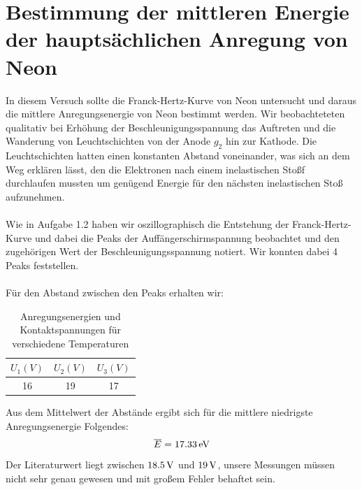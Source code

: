 \documentclass[a4paper,titlepage]{scrartcl}
\numberwithin{equation}{section}
\begin{document}
\section{Bestimmung der mittleren Energie der hauptsächlichen Anregung von Neon}
In diesem Versuch sollte die Franck-Hertz-Kurve von Neon untersucht und daraus die mittlere Anregungsenergie von Neon bestimmt werden. Wir beobachteteten qualitativ bei Erhöhung der Beschleunigungsspannung das Auftreten und die Wanderung von Leuchtschichten von der Anode $g_2$ hin zur Kathode. Die Leuchtschichten hatten einen konstanten Abstand voneinander, was sich an dem Weg erklären lässt, den die Elektronen nach einem inelastischen Stoßf durchlaufen mussten um genügend Energie für den nächsten inelastischen Stoß aufzunehmen.\\ \\
Wie in Aufgabe 1.2 haben wir oszillographisch die Entstehung der Franck-Hertz-Kurve und dabei die Peaks der Auffängerschirmspannung beobachtet und den zugehörigen Wert der Beschleunigungsspannung notiert. Wir konnten dabei 4 Peaks feststellen.\\ \\
Für den Abstand zwischen den Peaks erhalten wir:
\begin{table}[H]
\begin{tabular}{c|c|c}
	$U_1 (V)$ & $U_2 (V)$ & $U_3 (V)$ \\
	\hline
	16 & 19 & 17 \\
\end{tabular}
\caption{Anregungsenergien und Kontaktspannungen für verschiedene Temperaturen}
\label{tab:aufgabe3}
\end{table}
Aus dem Mittelwert der Abstände ergibt sich für die mittlere niedrigste Anregungsenergie Folgendes:
\begin{equation}
\overline{E}=\unit[17.33]{eV}
\end{equation}
Der Literaturwert liegt zwischen $\unit[18.5]{V}$ und $\unit[19]{V}$, unsere Messungen müssen nicht sehr genau gewesen und mit großem Fehler behaftet sein.
\end{document}
